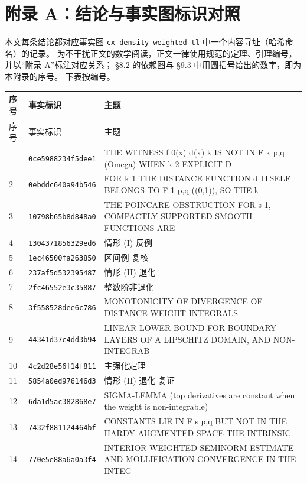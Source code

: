 \newpage
\section*{附录 A：结论与事实图标识对照}

\noindent 本文每条结论都对应事实图 \texttt{cx-density-weighted-tl} 中一个内容寻址（哈希命名）的记录。
为不干扰正文的数学阅读，正文一律使用规范的定理、引理编号，并以“附录 A”标注对应关系；
\S 8.2 的依赖图与 \S 9.3 中用圆括号给出的数字，即为本附录的序号。
下表按编号。

\begin{footnotesize}
\begin{longtable}{@{}p{1.0cm}p{4.3cm}p{8.1cm}@{}}
\toprule
序号 & 事实标识 & 主题 \\
\midrule
\endfirsthead
\toprule
序号 & 事实标识 & 主题 \\
\midrule
\endhead
\bottomrule
\endfoot
1 & \texttt{0ce5988234f5dee1} & THE WITNESS f 0(x) d(x) k IS NOT IN F k p,q (Omega) WHEN k 2 EXPLICIT D \\
2 & \texttt{0ebddc640a94b546} & FOR k 1 THE DISTANCE FUNCTION d ITSELF BELONGS TO F 1 p,q ((0,1)), SO THE k \\
3 & \texttt{10798b65b8d848a0} & THE POINCARE OBSTRUCTION FOR s 1, COMPACTLY SUPPORTED SMOOTH FUNCTIONS ARE \\
4 & \texttt{1304371856329ed6} & 情形 (I) 反例 \\
5 & \texttt{1ec46500fa263850} & 区间例 复核 \\
6 & \texttt{237af5d532395487} & 情形 (II) 退化 \\
7 & \texttt{2fc46552e3c35887} & 整数阶非退化 \\
8 & \texttt{3f558528dee6c786} & MONOTONICITY OF DIVERGENCE OF DISTANCE-WEIGHT INTEGRALS \\
9 & \texttt{44341d37c4dd3b94} & LINEAR LOWER BOUND FOR BOUNDARY LAYERS OF A LIPSCHITZ DOMAIN, AND NON-INTEGRAB \\
10 & \texttt{4c2d28e56f14f811} & 主强化定理 \\
11 & \texttt{5854a0ed976146d3} & 情形 (II) 退化 复证 \\
12 & \texttt{6da1d5ac382868e7} & SIGMA-LEMMA (top derivatives are constant when the weight is non-integrable) \\
13 & \texttt{7432f881124464bf} & CONSTANTS LIE IN F s p,q BUT NOT IN THE HARDY-AUGMENTED SPACE THE INTRINSIC \\
14 & \texttt{770e5e88a6a0a3f4} & INTERIOR WEIGHTED-SEMINORM ESTIMATE AND MOLLIFICATION CONVERGENCE IN THE INTEG \\

\end{longtable}
\end{footnotesize}
